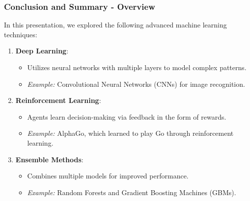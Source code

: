 \documentclass[aspectratio=169]{beamer}
\begin{document}
\begin{frame}[fragile]
    \frametitle{Conclusion and Summary - Overview}
    In this presentation, we explored the following advanced machine learning techniques:
    \begin{enumerate}
        \item \textbf{Deep Learning}: 
        \begin{itemize}
            \item Utilizes neural networks with multiple layers to model complex patterns.
            \item \textit{Example:} Convolutional Neural Networks (CNNs) for image recognition.
        \end{itemize}
        
        \item \textbf{Reinforcement Learning}: 
        \begin{itemize}
            \item Agents learn decision-making via feedback in the form of rewards.
            \item \textit{Example:} AlphaGo, which learned to play Go through reinforcement learning.
        \end{itemize}
        
        \item \textbf{Ensemble Methods}: 
        \begin{itemize}
            \item Combines multiple models for improved performance.
            \item \textit{Example:} Random Forests and Gradient Boosting Machines (GBMs).
        \end{itemize}
    \end{enumerate}
\end{frame}
\end{document}
